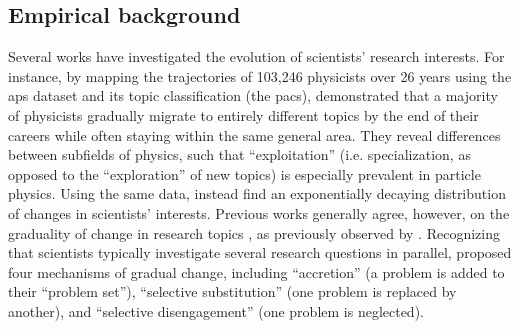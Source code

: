 \documentclass{article}
\begin{document}
\subsection{\label{sec:review}Empirical background}

Several works have investigated the evolution of scientists' research interests. For instance, by mapping the trajectories of 103,246 physicists over 26 years using the \gls{aps} dataset and its topic classification (the \gls{pacs}), \citet{Aleta2019} demonstrated that a majority of physicists gradually migrate to entirely different topics by the end of their careers while often staying within the same general area. They reveal differences between subfields of physics, such that ``exploitation'' (i.e. specialization, as opposed to the ``exploration'' of new topics) is especially prevalent in particle physics.  Using the same data, \citet{Jia2017} instead find an exponentially decaying distribution of changes in scientists' interests. %
Previous works generally agree, however, on the graduality of change in research topics \citep{Jia2017,Aleta2019,Zeng2019}, as previously observed by  \citet{Gieryn1978}. Recognizing that scientists typically investigate several research questions in parallel, \citeauthor{Gieryn1978} proposed four mechanisms of gradual change, including ``accretion'' (a problem is added to their ``problem set''),  ``selective substitution'' (one problem is replaced by another), and ``selective disengagement'' (one problem is neglected).
\end{document}
